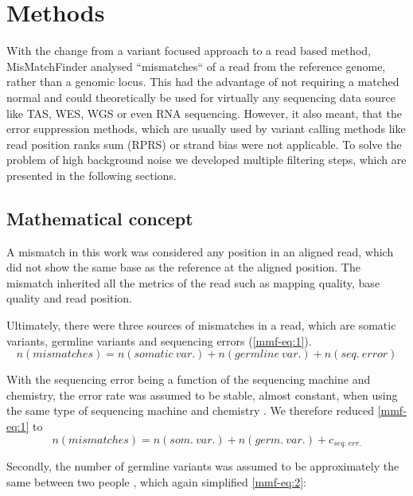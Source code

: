 \section{Methods}
\label{mmf-sec:methods}

With the change from a variant focused approach to a read based method, \linebreak MisMatchFinder analysed ``mismatches`` of a read from the reference genome, rather than a genomic locus. This had the advantage of not requiring a matched normal and could theoretically be used for virtually any sequencing data source like TAS, WES, WGS or even RNA sequencing. However, it also meant, that the error suppression methods, which are usually used by variant calling methods like read position ranks sum (RPRS) or strand bias were not applicable. To solve the problem of high background noise we developed multiple filtering steps, which are presented in the following sections.

\subsection{Mathematical concept}
\label{mmf-sec:concept}
A mismatch in this work was considered  any position in an aligned read, which did not show the same base as the reference at the aligned position. The mismatch inherited all the metrics of the read such as mapping quality, base quality and read position. 

Ultimately, there were three sources of mismatches in a read, which are somatic variants, germline variants and sequencing errors (\autoref{mmf-eq:1}).
\begin{equation}
n(mismatches) = n(somatic~var.) + n(germline~var.)  + n(seq.~ error)
\label{mmf-eq:1}
\end{equation}
\myequation[\ref{mmf-eq:1}]{MisMatchFinder: number of mismatches}

With the sequencing error being a function of the sequencing machine and chemistry, the error rate was assumed to be stable, almost constant, when using the same type of sequencing machine and chemistry \cite{Schirmer2016,Stoler2021}. We therefore reduced \autoref{mmf-eq:1} to
\begin{equation}
n(mismatches) = n(som.~var.) + n(germ.~var.)  + c_{seq.~err.}
\label{mmf-eq:2}
\end{equation}
\myequation[\ref{mmf-eq:2}]{MisMatchFinder: sequencing error}

Secondly, the number of germline variants was assumed to be approximately the same between two people \cite{Auton2015}, which again simplified \autoref{mmf-eq:2}:

